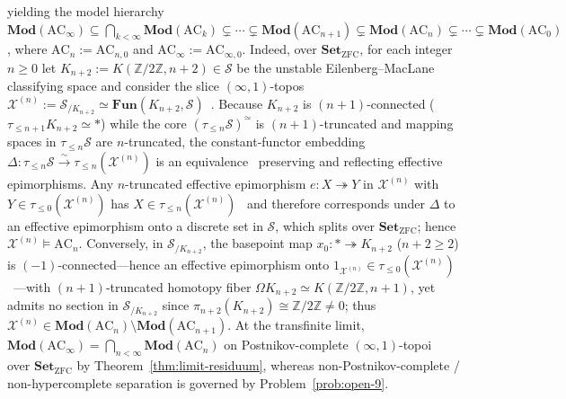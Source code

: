 \documentclass[10pt,twoside,openright]{book}
\theoremstyle{crmplain}
\theoremstyle{crmdef}
\theoremstyle{crmremark}
\begin{document}
yielding the model hierarchy $\mathbf{Mod}(\mathrm{AC}_\infty) \subseteq \allowbreak \bigcap_{k < \infty} \mathbf{Mod}(\mathrm{AC}_k) \subsetneq \allowbreak \cdots \subsetneq \allowbreak \mathbf{Mod}(\mathrm{AC}_{n+1}) \subsetneq \allowbreak \mathbf{Mod}(\mathrm{AC}_n) \subsetneq \allowbreak \cdots \subsetneq \allowbreak \mathbf{Mod}(\mathrm{AC}_0)$, where $\mathrm{AC}_n := \mathrm{AC}_{n, 0}$ and $\mathrm{AC}_\infty := \mathrm{AC}_{\infty, 0}$. Indeed, over $\mathbf{Set}_{\mathrm{ZFC}}$, for each integer $n \ge 0$ let $K_{n+2} := K(\mathbb{Z}/2\mathbb{Z}, n+2) \in \mathcal{S}$ be the unstable Eilenberg--MacLane classifying space and consider the slice $(\infty,1)$-topos $\mathcal{X}^{(n)} := \mathcal{S}_{/K_{n+2}} \simeq \mathbf{Fun}(K_{n+2}, \mathcal{S})$~\cite[Proposition~6.3.5.1]{Lurie09}. Because $K_{n+2}$ is $(n+1)$-connected ($\tau_{\le n+1}K_{n+2} \simeq *$) while the core $(\tau_{\le n}\mathcal{S})^{\simeq}$ is $(n+1)$-truncated and mapping spaces in $\tau_{\le n}\mathcal{S}$ are $n$-truncated, the constant-functor embedding $\Delta : \tau_{\le n}\mathcal{S} \xrightarrow{\sim} \tau_{\le n}(\mathcal{X}^{(n)})$ is an equivalence~\cite[Proposition~5.5.6.18]{Lurie09} preserving and reflecting effective epimorphisms. Any $n$-truncated effective epimorphism $e : X \twoheadrightarrow Y$ in $\mathcal{X}^{(n)}$ with $Y \in \tau_{\le 0}(\mathcal{X}^{(n)})$ has $X \in \tau_{\le n}(\mathcal{X}^{(n)})$~\cite[Lemma~5.5.6.14]{Lurie09} and therefore corresponds under $\Delta$ to an effective epimorphism onto a discrete set in $\mathcal{S}$, which splits over $\mathbf{Set}_{\mathrm{ZFC}}$; hence $\mathcal{X}^{(n)} \models \mathrm{AC}_n$. Conversely, in $\mathcal{S}_{/K_{n+2}}$, the basepoint map $x_0 : * \twoheadrightarrow K_{n+2}$ ($n+2 \ge 2$) is $(-1)$-connected---hence an effective epimorphism onto $1_{\mathcal{X}^{(n)}} \in \tau_{\le 0}(\mathcal{X}^{(n)})$~\cite[Proposition~7.2.1.14]{Lurie09}---with $(n+1)$-truncated homotopy fiber $\Omega K_{n+2} \simeq K(\mathbb{Z}/2\mathbb{Z}, n+1)$, yet admits no section in $\mathcal{S}_{/K_{n+2}}$ since $\pi_{n+2}(K_{n+2}) \cong \mathbb{Z}/2\mathbb{Z} \neq 0$; thus $\mathcal{X}^{(n)} \in \mathbf{Mod}(\mathrm{AC}_n) \setminus \mathbf{Mod}(\mathrm{AC}_{n+1})$. At the transfinite limit, $\mathbf{Mod}(\mathrm{AC}_\infty) = \bigcap_{n < \infty} \mathbf{Mod}(\mathrm{AC}_n)$ on Postnikov-complete $(\infty,1)$-topoi~\cite[\S 5.5.6, \S 7.2.1]{Lurie09} over $\mathbf{Set}_{\mathrm{ZFC}}$ by Theorem~\ref{thm:limit-residuum}, whereas non-Postnikov-complete / non-hypercomplete separation is governed by Problem~\ref{prob:open-9}.
\end{document}
